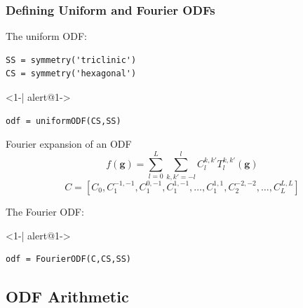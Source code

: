 \begin{frame}[fragile]
  \frametitle{Defining Uniform and  Fourier ODFs}

  The uniform ODF:
\begin{lstlisting}
SS = symmetry('triclinic')
CS = symmetry('hexagonal')
\end{lstlisting}

  \begin{actionenv}<1-| alert@1->
\begin{lstlisting}
odf = uniformODF(CS,SS)
\end{lstlisting}
  \end{actionenv}

  \begin{block}{Fourier expansion of an ODF}
    \begin{equation*}
      f(\mathbf g) = \sum_{l=0}^L \sum_{k,k'=-l}^l C_l^{k,k'} T_l^{k,k'}(\mathbf g)
    \end{equation*}
    \begin{equation*}
      C = [C_0,C_1^{-1,-1},C_1^{0,-1},C_1^{1,-1},\ldots,C_1^{1,1},C_2^{-2,-2},\ldots,C_L^{L,L}]
    \end{equation*}
  \end{block}
The Fourier ODF:
  \begin{actionenv}<1-| alert@1->
\begin{lstlisting}
odf = FourierODF(C,CS,SS)
\end{lstlisting}
  \end{actionenv}



\end{frame}

\subsection*{ODF Arithmetic}

